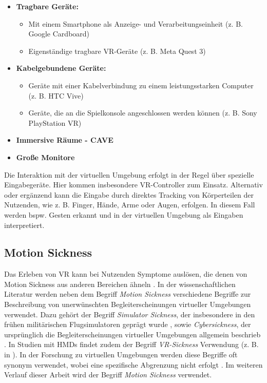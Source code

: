 \begin{itemize}
    \item \textbf{Tragbare Geräte:} 
    \begin{itemize}
        \item Mit einem Smartphone als Anzeige- und Verarbeitungseinheit (z. B.  Google Cardboard)
        \item Eigenständige tragbare VR-Geräte (z. B.  Meta Quest 3)
    \end{itemize}
    \item \textbf{Kabelgebundene Geräte:} 
    \begin{itemize}
        \item Geräte mit einer Kabelverbindung zu einem leistungsstarken Computer (z. B.  HTC Vive)
        \item Geräte, die an die Spielkonsole angeschlossen werden können (z. B.  Sony PlayStation VR)
    \end{itemize}
    \item \textbf{Immersive Räume - CAVE}
    \item \textbf{Große Monitore}
\end{itemize}

Die Interaktion mit der virtuellen Umgebung erfolgt in der Regel über spezielle Eingabegeräte. Hier kommen insbesondere VR-Controller zum Einsatz. Alternativ oder ergänzend kann die Eingabe durch direktes Tracking von Körperteilen der Nutzenden, wie z. B.  Finger, Hände, Arme oder Augen, erfolgen. In diesem Fall werden bspw. Gesten erkannt und in der virtuellen Umgebung als Eingaben interpretiert\citep{dorner_virtual_2019}.

\subsection{Motion Sickness}

Das Erleben von VR kann bei Nutzenden Symptome auslösen, die denen von Motion Sickness aus anderen Bereichen ähneln \citep{somrak_estimating_2019}. In der wissenschaftlichen Literatur werden neben dem Begriff \textit{Motion Sickness} verschiedene Begriffe zur Beschreibung von unerwünschten Begleiterscheinungen virtueller Umgebungen verwendet. Dazu gehört der Begriff \textit{Simulator Sickness}, der insbesondere in den frühen militärischen Flugsimulatoren geprägt wurde \citep{kennedy_simulator_1993}, sowie \textit{Cybersickness}, der ursprünglich die Begleiterscheinungen virtueller Umgebungen allgemein beschrieb \citep{10.5555/2870742.2870748}. In Studien mit HMDs findet zudem der Begriff \textit{VR-Sickness} Verwendung (z. B.  in \citep{kim_virtual_2018}). In der Forschung zu virtuellen Umgebungen werden diese Begriffe oft synonym verwendet, wobei eine spezifische Abgrenzung nicht erfolgt \citep{saredakis_factors_2020}. Im weiteren Verlauf dieser Arbeit wird der Begriff \textit{Motion Sickness} verwendet. 


